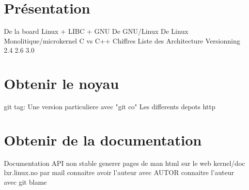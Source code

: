 %
%
%

\part{Présentation}

  De la board
  Linux + LIBC + GNU
  De GNU/Linux
  De Linux
     Monolitique/microkernel
     C vs C++
  Chiffres
  Liste des Architecture
  Versionning 2.4 2.6 3.0

\part{Obtenir le noyau}

  git
    tag: Une version particuliere avec "git co"
    Les differents depots
  http

\part{Obtenir de la documentation}

  Documentation
  API non stable
  generer
     pages de man
     html
  sur le web
     kernel/doc
     lxr.linux.no
  par mail
    connaitre avoir l'auteur avec AUTOR
    connaitre l'auteur avec git blame

